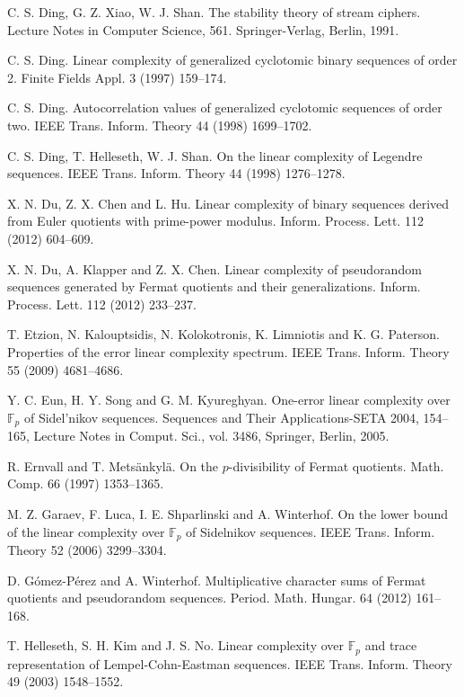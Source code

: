 \documentclass [11pt,a4paper]{article}
\def\F{\mathbb{F}}
\begin{document}
\begin{thebibliography}{99}
C. S. Ding, G. Z. Xiao,  W. J. Shan.  The stability theory of stream
ciphers. Lecture Notes in Computer Science, 561. Springer-Verlag,
Berlin, 1991.

C. S. Ding. Linear complexity of generalized cyclotomic binary sequences
of order 2. Finite Fields Appl. 3 (1997)  159--174.


C. S. Ding. Autocorrelation values of generalized cyclotomic sequences of order two.
 IEEE Trans. Inform. Theory 44 (1998)  1699--1702.


C. S. Ding,  T. Helleseth,  W. J. Shan.  On the linear complexity of
Legendre sequences. IEEE Trans. Inform. Theory 44 (1998)
1276--1278.

X. N. Du, Z. X. Chen and L. Hu. Linear complexity of binary
sequences derived from Euler quotients with prime-power modulus.
Inform. Process. Lett. 112 (2012) 604--609.

X. N. Du, A. Klapper and Z. X. Chen. Linear complexity of
pseudorandom sequences generated by Fermat quotients and their
generalizations. Inform. Process. Lett. 112 (2012) 233--237.


T. Etzion, N. Kalouptsidis, N. Kolokotronis, K. Limniotis and K. G. Paterson. Properties of the error linear complexity spectrum. IEEE Trans. Inform. Theory 55 (2009)  4681--4686.

Y. C. Eun, H. Y. Song and G. M. Kyureghyan. One-error linear complexity over $\F_p$ of Sidel'nikov sequences.
Sequences and Their Applications-SETA 2004, 154--165, Lecture Notes in Comput. Sci., vol. 3486, Springer, Berlin, 2005.


 R. Ernvall and T. Mets{\"a}nkyl{\"a}.
On the $p$-divisibility of Fermat quotients. Math. Comp.  66 (1997)
1353--1365.


M. Z. Garaev, F. Luca, I. E. Shparlinski and A. Winterhof. On the lower bound of the linear complexity over $\F_p$  of Sidelnikov sequences. IEEE Trans. Inform. Theory 52 (2006)  3299--3304.





 D. G\'{o}mez-P\'{e}rez and A. Winterhof. Multiplicative character sums of
Fermat quotients and pseudorandom sequences. Period. Math. Hungar.
64 (2012) 161--168.






T. Helleseth, S. H. Kim and  J. S. No. Linear complexity over $\F_p$   and trace representation of Lempel-Cohn-Eastman sequences. IEEE Trans. Inform. Theory 49 (2003)  1548--1552.


\end{thebibliography}
\end{document}
